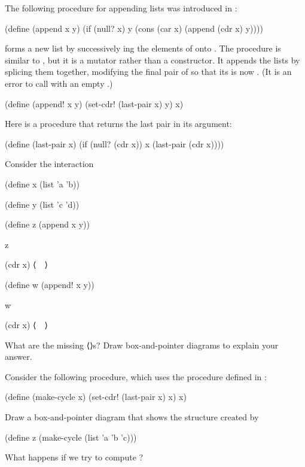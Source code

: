\begin{exercise}
	\label{Exercise 3.12}
	The following procedure for appending lists was introduced in :
	\begin{scheme}
	  (define (append x y)
	    (if (null? x)
	        y
	        (cons (car x) (append (cdr x) y))))
	\end{scheme}
	 forms a new list by successively ing the elements of  onto .
	The procedure  is similar to , but it is a mutator rather than a constructor.
	It appends the lists by splicing them together, modifying the final pair of  so that its  is now .
	(It is an error to call  with an empty .)
	\begin{scheme}
	  (define (append! x y)
	    (set-cdr! (last-pair x) y)
	    x)
	\end{scheme}
	Here  is a procedure that returns the last pair in its argument:
	\begin{scheme}
	  (define (last-pair x)
	  (if (null? (cdr x)) x (last-pair (cdr x))))
	\end{scheme}
	Consider the interaction
	\begin{scheme}
	  (define x (list 'a 'b))

	  (define y (list 'c 'd))

	  (define z (append x y))

	  z
	  ~~

	  (cdr x)
	  ⟨~~⟩

	  (define w (append! x y))

	  w
	  ~~

	  (cdr x)
	  ⟨~~⟩
	\end{scheme}
	What are the missing ⟨⟩s?
	Draw box-and-pointer diagrams to explain your answer.
\end{exercise}



\begin{exercise}
	\label{Exercise 3.13}
	Consider the following  procedure, which uses the  procedure defined in \link{Exercise 3.12}:
	\begin{scheme}
	  (define (make-cycle x)
	    (set-cdr! (last-pair x) x)
	    x)
	\end{scheme}
	Draw a box-and-pointer diagram that shows the structure  created by
	\begin{scheme}
	  (define z (make-cycle (list 'a 'b 'c)))
	\end{scheme}
	What happens if we try to compute ?
\end{exercise}



